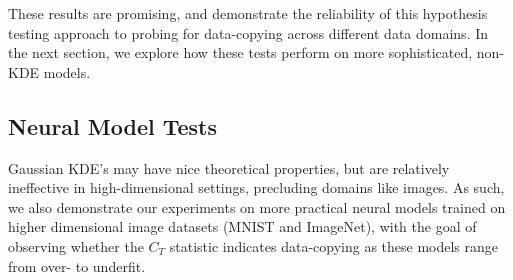 These results are promising, and demonstrate the reliability of this hypothesis testing approach to probing for data-copying across different data domains. In the next section, we explore how these tests perform on more sophisticated, non-KDE models. 

\subsection{Neural Model Tests}
\label{sec:neural model tests}
Gaussian KDE's may have nice theoretical properties, but are relatively ineffective in high-dimensional settings, precluding domains like images. As such, we also demonstrate our experiments on more practical neural models trained on higher dimensional image datasets (MNIST and ImageNet), with the goal of observing whether the $C_T$ statistic indicates data-copying as these models range from over- to underfit. 

